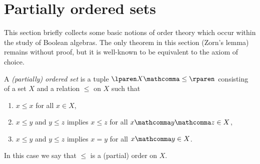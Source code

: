 \section{Partially ordered sets}
\label{sec:orders}

This section briefly collects some basic notions of order theory
which occur within the study of Boolean algebras.
The only theorem in this section (Zorn's lemma) remains without proof,
but it is well-known to be equivalent to the axiom of choice.

\medskip

\begin{definition}
  A \emph{(partially) ordered set} is a tuple
  $\lparen X \mathcomma \leq \rparen$
  consisting of a set $X$ and a relation $\leq$ on $X$ such that
  \begin{enumerate}
    \item $x \leq x$ for all $x \in X$,
    \item $x \leq y$ and $y \leq z$ implies $x \leq z$
    for all $x \mathcomma y \mathcomma z \in X$,
    \item $x \leq y$ and $y \leq z$ implies $x \equal y$
    for all $x \mathcomma y \in X$.
  \end{enumerate}
  In this case we say that $\leq$ is a (partial) order on $X$.
\end{definition}


